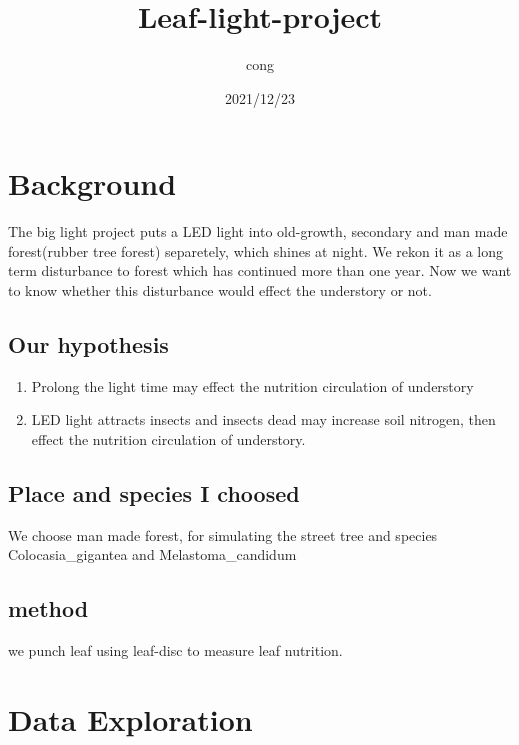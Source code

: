 \documentclass[
]{article}
\title{Leaf-light-project}
\author{cong}
\date{2021/12/23}
\providecommand{\tightlist}{%
  \setlength{\itemsep}{0pt}\setlength{\parskip}{0pt}}
\begin{document}
\maketitle

{
\setcounter{tocdepth}{2}
\tableofcontents
}
\hypertarget{background}{%
\section{Background}\label{background}}

The big light project puts a LED light into old-growth, secondary and
man made forest(rubber tree forest) separetely, which shines at night.
We rekon it as a long term disturbance to forest which has continued
more than one year. Now we want to know whether this disturbance would
effect the understory or not.

\hypertarget{our-hypothesis}{%
\subsection{Our hypothesis}\label{our-hypothesis}}

\begin{enumerate}
\def\labelenumi{\arabic{enumi})}
\tightlist
\item
  Prolong the light time may effect the nutrition circulation of
  understory
\item
  LED light attracts insects and insects dead may increase soil
  nitrogen, then effect the nutrition circulation of understory.
\end{enumerate}

\hypertarget{place-and-species-i-choosed}{%
\subsection{Place and species I
choosed}\label{place-and-species-i-choosed}}

We choose man made forest, for simulating the street tree and species
Colocasia\_gigantea and Melastoma\_candidum

\hypertarget{method}{%
\subsection{method}\label{method}}

we punch leaf using leaf-disc to measure leaf nutrition.

\hypertarget{data-exploration}{%
\section{Data Exploration}\label{data-exploration}}
\end{document}
